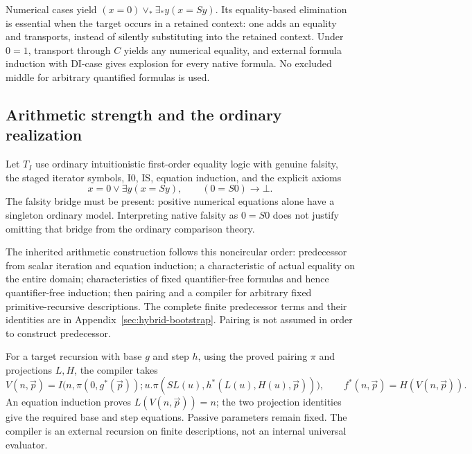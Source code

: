 \documentclass[11pt,letterpaper]{article}
\theoremstyle{definition}\newtheorem{definition}[theorem]{Definition}
\theoremstyle{remark}\newtheorem{remark}[theorem]{Remark}
\begin{document}
Numerical cases yield
$(x=0)\vee_*\exists_*y(x=Sy)$. Its equality-based elimination is essential
when the target occurs in a retained context: one adds an equality and
transports, instead of silently substituting into the retained context.
Under $0=1$, transport through $C$ yields any numerical equality, and
external formula induction with DI-case gives explosion for every native
formula. No excluded middle for arbitrary quantified formulas is used.

\subsection{Arithmetic strength and the ordinary realization}

Let $T_I$ use ordinary intuitionistic first-order equality logic with
genuine falsity, the staged iterator symbols, I0, IS, equation induction,
and the explicit axioms
\[
 x=0\vee\exists y(x=Sy),\qquad (0=S0)\to\bot.
\]
The falsity bridge must be present: positive numerical equations alone
have a singleton ordinary model. Interpreting native falsity as $0=S0$
does not justify omitting that bridge from the ordinary comparison theory.

The inherited arithmetic construction follows this noncircular order:
predecessor from scalar iteration and equation induction; a characteristic
of actual equality on the entire domain; characteristics of fixed
quantifier-free formulas and hence quantifier-free induction; then pairing
and a compiler for arbitrary fixed primitive-recursive descriptions.
The complete finite predecessor terms and their identities are in
Appendix~\ref{sec:hybrid-bootstrap}. Pairing is not assumed in order to
construct predecessor.

For a target recursion with base $g$ and step $h$, using the proved pairing
$\pi$ and projections $L,H$, the compiler takes
\[
 V(n,\vec p)=I\bigl(n,\pi(0,g^*(\vec p));
 u.\pi(SL(u),h^*(L(u),H(u),\vec p))\bigr),
 \qquad f^*(n,\vec p)=H(V(n,\vec p)).
\]
An equation induction proves $L(V(n,\vec p))=n$; the two projection
identities give the required base and step equations. Passive parameters
remain fixed. The compiler is an external recursion on finite descriptions,
not an internal universal evaluator.
\end{document}
